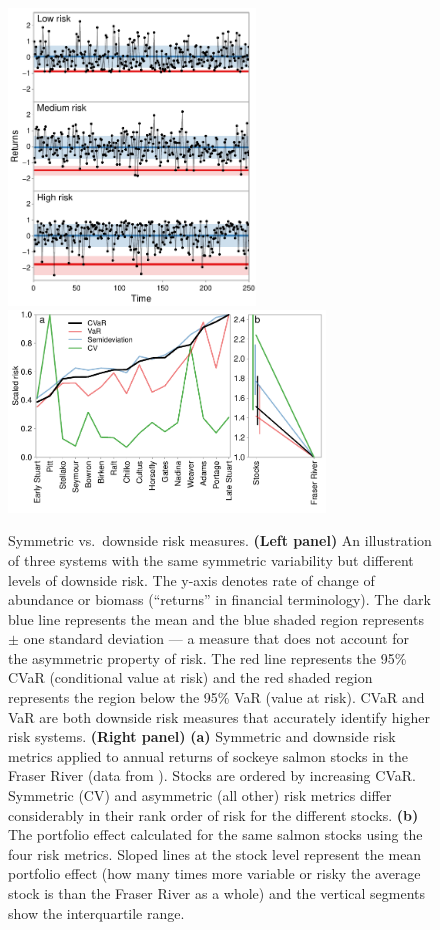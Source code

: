 \begin{figure}[htbp]
\centering
\includegraphics[height=3.10in]{skewness-abundance.pdf}
\includegraphics[height=2.11in]{compare-risk-and-portfolio-scale.pdf} \caption{
  Symmetric vs.\ downside risk measures. \textbf{(Left panel)} An illustration
  of three systems with the same symmetric variability but different levels of
  downside risk. The y-axis denotes rate of change of abundance or biomass
  (``returns'' in financial terminology). The dark blue line represents the
  mean and the blue shaded region represents $\pm$ one standard deviation --- a
  measure that does not account for the asymmetric property of risk. The red
  line represents the 95\% CVaR (conditional value at risk) and the red shaded
  region represents the region below the 95\% VaR (value at risk). CVaR and VaR
  are both downside risk measures that accurately identify higher risk systems.
  \textbf{(Right panel)} \textbf{(a)} Symmetric and downside risk metrics
  applied to annual returns of sockeye salmon stocks in the Fraser River (data
  from \citeauthor{dorner2008} \citeyear{dorner2008}). Stocks are ordered by
  increasing CVaR. Symmetric (CV) and asymmetric (all other) risk metrics
  differ considerably in their rank order of risk for the different stocks.
  \textbf{(b)} The portfolio effect calculated for the same salmon stocks using
  the four risk metrics. Sloped lines at the stock level represent the mean
  portfolio effect (how many times more variable or risky the average stock is
  than the Fraser River as a whole) and the vertical segments show the
  interquartile range.} \label{fig:risk}
\end{figure}
